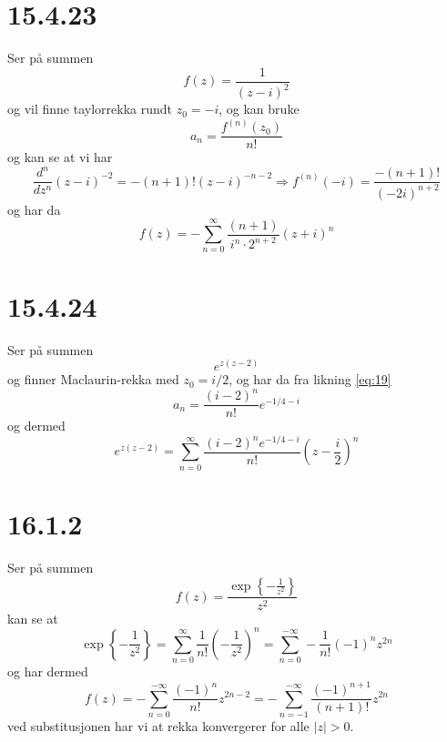 \documentclass{report}
\newcommand{\nbrack}[1]{\left( #1 \right)}
\newcommand{\cbrack}[1]{\left\lbrace #1 \right\rbrace}
\begin{document}
\section*{15.4.23}
Ser på summen
\begin{equation}
  \label{eq:15}
  f(z) = \frac{1}{(z-i)^{2}}
\end{equation}
og vil finne taylorrekka rundt $z_{0} = -i$, og kan bruke
\begin{equation}
  \label{eq:19}
  a_{n} = \frac{f^{(n)}(z_{0})}{n!}
\end{equation}
og kan se at vi har
\begin{equation}
  \label{eq:20}
  \frac{d^{n}}{dz^{n}} (z-i)^{-2} = -(n+1)! (z-i)^{-n-2} \Rightarrow f^{(n)}(-i) = \frac{-(n+1)!}{(-2i)^{n+2}}
\end{equation}
og har da
\begin{equation}
  \label{eq:21}
  f(z) = -\sum_{n=0}^{\infty} \frac{ (n+1) }{i^{n} \cdot 2^{n+2}} (z + i)^{n}
\end{equation}


\section*{15.4.24}
Ser på summen
\begin{equation}
  \label{eq:22}
  e^{z(z-2)}
\end{equation}
og finner Maclaurin-rekka med $z_{0} = i/2$, og har da fra likning \eqref{eq:19}
\begin{equation}
  \label{eq:26}
  a_{n} = \frac{\nbrack{ i - 2 }^{n}}{n!} e^{-1/4 - i}
\end{equation}
og dermed
\begin{equation}
  \label{eq:25}
  e^{z(z-2)} = \sum_{n=0}^{\infty} \frac{\nbrack{ i-2 }^{n} e^{-1/4 - i}}{n!} \nbrack{ z - \frac{i}{2} }^{n}
\end{equation}


\section*{16.1.2}
Ser på summen
\begin{equation}
  \label{eq:27}
  f(z) = \frac{\exp\cbrack{ -\frac{1}{z^{2}} }}{z^{2}}
\end{equation}
kan se at
\begin{equation}
  \label{eq:28}
  \exp\cbrack{ -\frac{1}{z^{2}} } = \sum_{n=0}^{\infty} \frac{1}{n!} \nbrack{ -\frac{1}{z^{2}} }^{n} = \sum_{n=0}^{-\infty} -\frac{1}{n!} (-1)^{n} z^{2n}
\end{equation}
og har dermed
\begin{equation}
  \label{eq:29}
  f(z) = -\sum_{n=0}^{-\infty} \frac{(-1)^{n}}{n!} z^{2n - 2} = -\sum_{n=-1}^{-\infty} \frac{(-1)^{n+1}}{(n+1)!} z^{2n}
\end{equation}
ved substitusjonen har vi at rekka konvergerer for alle $|z| > 0$.
\end{document}
